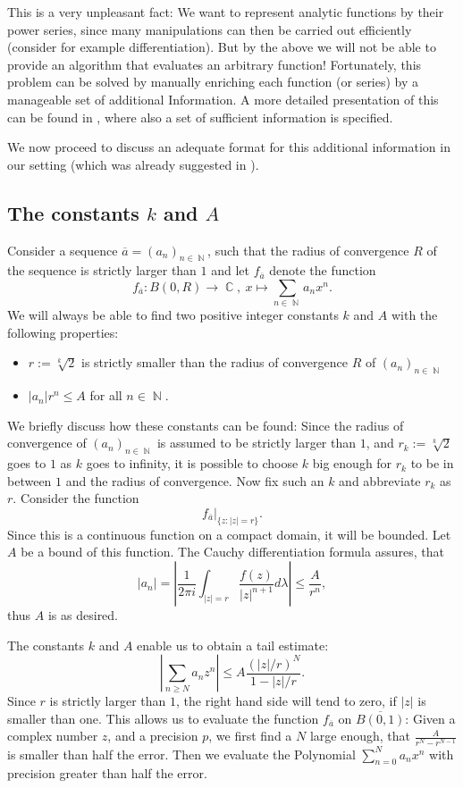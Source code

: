 \documentclass{article}
\DeclareMathOperator{\NN}{\ensuremath{\mathbb{N}}\xspace}
\DeclareMathOperator{\CC}{\ensuremath{\mathbb{C}}\xspace}
\begin{document}
This is a very unpleasant fact: We want to represent analytic functions by their power series, since many manipulations can then be carried out efficiently (consider for example differentiation). But by the above we will not be able to provide an algorithm that evaluates an arbitrary function! Fortunately, this problem can be solved by manually enriching each function (or series) by a manageable set of additional Information. A more detailed presentation of this can be found in \cite{Mue95}, where also a set of sufficient information is specified.

We now proceed to discuss an adequate format for this additional information in our setting (which was already suggested in \cite{gevrey}).


\subsection[The constants k and A]{The constants $k$ and $A$}\label{sec: The constants k and A}

Consider a sequence $\overline a = (a_n)_{n\in \NN}$, such that the radius of convergence $R$ of the sequence is strictly larger than $1$ and let $f_{\overline a}$ denote the function
\[ f_{\overline a}: B(0,R) \to \CC,~ x \mapsto \sum_{n\in \NN} a_n x^n. \]
We will always be able to find two positive integer constants $k$ and $A$ with the following properties:
\begin{itemize}
\item $r:=\sqrt[k]{2}$ is strictly smaller than the radius of convergence $R$ of $(a_n)_{n\in \NN}$
\item $|a_n|  r^n \leq A$ for all $n\in \NN$.
\end{itemize}
We briefly discuss how these constants can be found: Since the radius of convergence of $(a_n)_{n\in \NN}$ is assumed to be strictly larger than $1$, and $r_k:=\sqrt[k] 2$ goes to $1$ as $k$ goes to infinity, it is possible to choose $k$ big enough for $r_k$ to be in between $1$ and the radius of convergence. Now fix such an $k$ and abbreviate $r_k$ as $r$. Consider the function
\[ f_{\overline a}|_{\{z:|z| = r\}}. \]
Since this is a continuous function on a compact domain, it will be bounded. Let $A$ be a bound of this function. The Cauchy differentiation formula assures, that
\[ |a_n |=  \left|\frac 1 {2\pi i}\int_{|z| = r} \frac{f(z)}{|z|^{n+1}} d\lambda\right| \leq \frac A {r^n}, \]
thus $A$ is as desired.

The constants $k$ and $A$ enable us to obtain a tail estimate:
\[ \left|\sum_{n \geq N} a_n z^n\right| \leq A \frac{(|z|/r)^N}{1- |z|/r}. \]
Since $r$ is strictly larger than $1$, the right hand side will tend to zero, if $|z|$ is smaller than one. This allows us to evaluate the function $f_{\overline a}$ on $\overline{B(0,1)}$: Given a complex number $z$, and a precision $p$, we first find a $N$ large enough, that $\frac A{r^N-r^{N-1}}$ is smaller than half the error. Then we evaluate the Polynomial $\sum_{n = 0}^N a_n x^n$ with precision greater than half the error.
\end{document}
